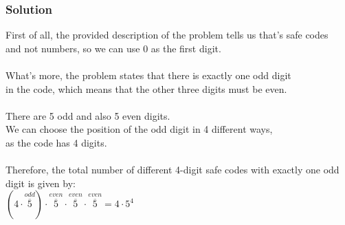 \documentclass{article}
\begin{document}
\subsubsection*{Solution}
First of all, the provided description of the problem tells us that's safe codes\\
and not numbers, so we can use 0 as the first digit.\\
\\
What's more, the problem states that there is exactly one odd digit\\
in the code, which means that the other three digits must be even.\\
\\
There are 5 odd and also 5 even digits.
\\
We can choose the position of the odd digit in 4 different ways,\\
as the code has 4 digits.\\
\\
Therefore, the total number of different 4-digit safe codes with exactly one odd digit is given by:\\
$(4 \cdot \overset{odd}{\overline{5}}) \cdot \overset{even}{\overline{5}} \cdot \overset{even}{\overline{5}} \cdot \overset{even}{\overline{5}} = 4 \cdot 5^4$
\end{document}
